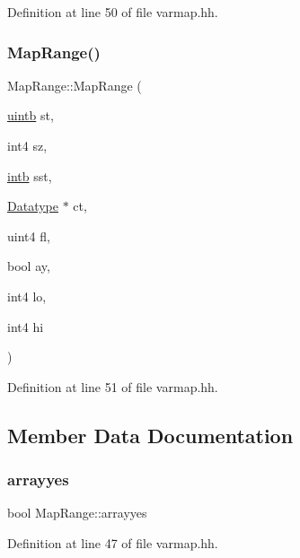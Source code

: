 Definition at line 50 of file varmap.\+hh.

\mbox{\label{struct_map_range_a49fce86d8908927a7e31dd3724c62e10}} 
\subsubsection{\texorpdfstring{MapRange()}{MapRange()}\hspace{0.1cm}{\footnotesize\ttfamily [2/2]}}
{\footnotesize\ttfamily Map\+Range\+::\+Map\+Range (\begin{DoxyParamCaption}\item[{\mbox{\hyperlink{types_8h_a2db313c5d32a12b01d26ac9b3bca178f}{uintb}}}]{st,  }\item[{int4}]{sz,  }\item[{\mbox{\hyperlink{types_8h_aa925ba3e627c2df89d5b1cfe84fb8572}{intb}}}]{sst,  }\item[{\mbox{\hyperlink{class_datatype}{Datatype}} $\ast$}]{ct,  }\item[{uint4}]{fl,  }\item[{bool}]{ay,  }\item[{int4}]{lo,  }\item[{int4}]{hi }\end{DoxyParamCaption})\hspace{0.3cm}{\ttfamily [inline]}}



Definition at line 51 of file varmap.\+hh.



\subsection{Member Data Documentation}
\mbox{\label{struct_map_range_a813c3cb287656c1894baaa075d6da72a}} 
\subsubsection{\texorpdfstring{arrayyes}{arrayyes}}
{\footnotesize\ttfamily bool Map\+Range\+::arrayyes}



Definition at line 47 of file varmap.\+hh.

\mbox{\label{struct_map_range_afa1d0275d37ed7ed5e7971fcca0e9814}} 
